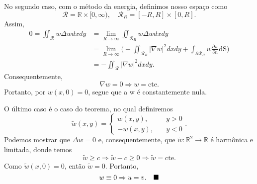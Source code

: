 \documentclass[../pde_notes.tex]{subfiles}
\begin{document}
\begin{proof*}
	No segundo caso, com o método da energia, definimos nosso espaço como
	\[
		\mathcal{R} = \mathbb{R}\times [0, \infty),\quad \mathcal{R}_{R} = [-R, R]\times [0, R].
	\]
	Assim,
	\begin{align*}
		0 = \iint_{\mathcal{R}}w\Delta w dxdy & = \lim_{R\to \infty}\iint_{\mathcal{R}_{R}}w\Delta w dxdy                                                                                                         \\
		                                      & = \lim_{R\to \infty}\biggl(-\iint_{\mathcal{R}_{R}}|\nabla w|^{2}dxdy + \int_{\partial \mathcal{R}_{R}}^{}w \frac{\partial^{}w}{\partial n^{}} \mathrm{dS}\biggr) \\
		                                      & = -\iint_{\mathcal{R}}|\nabla w|^{2}dxdy.
	\end{align*}
	Consequentemente,
	\[
		\nabla w = 0 \Rightarrow w = \mathrm{cte.}
	\]
	Portanto, por \(w(x, 0) = 0\), segue que a w é constantemente nula.

	O último caso é o caso do teorema, no qual definiremos
	\[
		\tilde{w}(x, y) = \left\{\begin{array}{ll}
			w(x, y),  & \quad y > 0  \\
			-w(x, y), & \quad  y < 0
		\end{array}\right..
	\]
	Podemos mostrar que \(\Delta w = 0\) e, consequentemente, que \(\tilde{w}:\mathbb{R}^{2}\rightarrow \mathbb{R}\) é harmônica e limitada, donde temos
	\[
		\tilde{w} \geq c \Rightarrow \tilde{w} - c \geq 0 \Rightarrow \tilde{w} = \mathrm{cte.}
	\]
	Como \(\tilde{w}(x, 0) = 0\), então \(\tilde{w} = 0\). Portanto,
	\[
		w \equiv 0 \Rightarrow u = v.\quad \text{$\blacksquare$}
	\]
\end{proof*}
\end{document}
